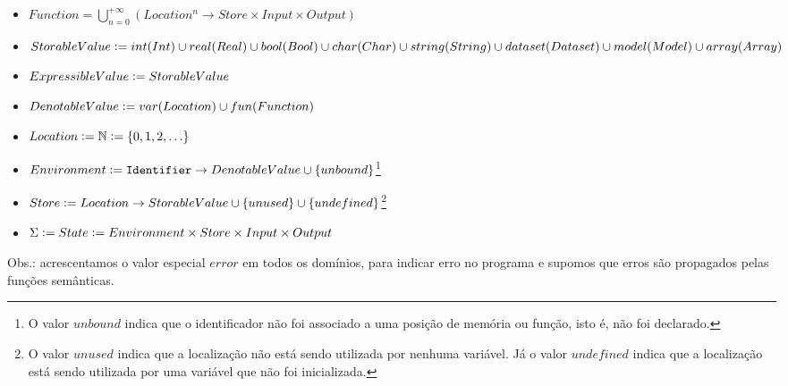 \documentclass[12pt]{article}
\newcommand{\defeq}{\vcentcolon=}
\begin{document}
\begin{itemize}
\item $Function = \bigcup_{n = 0}^{+\infty} (Location^n \rightarrow Store \times Input \times Output)$

\item $StorableValue \defeq int(Int) \cup real(Real) \cup bool(Bool) \cup char(Char) \cup string(String) \cup dataset(Dataset) \cup model(Model) \cup array(Array)$
\item $ExpressibleValue \defeq StorableValue$

\item $DenotableValue \defeq var(Location) \cup fun(Function)$
\item $Location \defeq \mathbb{N} \defeq \{0, 1, 2, \ldots\}$
\item $Environment \defeq {\tt Identifier} \to DenotableValue \cup \{unbound\}$\footnote{O valor $unbound$ indica que o identificador não foi associado a uma posição de memória ou função, isto é, não foi declarado.}
\item $Store \defeq Location\to StorableValue \cup \{unused\} \cup \{undefined\}$\footnote{O valor $unused$ indica que a localização não está sendo utilizada por nenhuma variável. Já o valor $undefined$ indica que a localização está sendo utilizada por uma variável que não foi inicializada.}

\item $\Sigma \defeq State \defeq Environment \times Store \times Input \times Output$


\end{itemize}

Obs.: acrescentamos o valor especial $error$ em todos os domínios, para indicar erro no programa e supomos que erros são propagados pelas funções semânticas.
\end{document}
